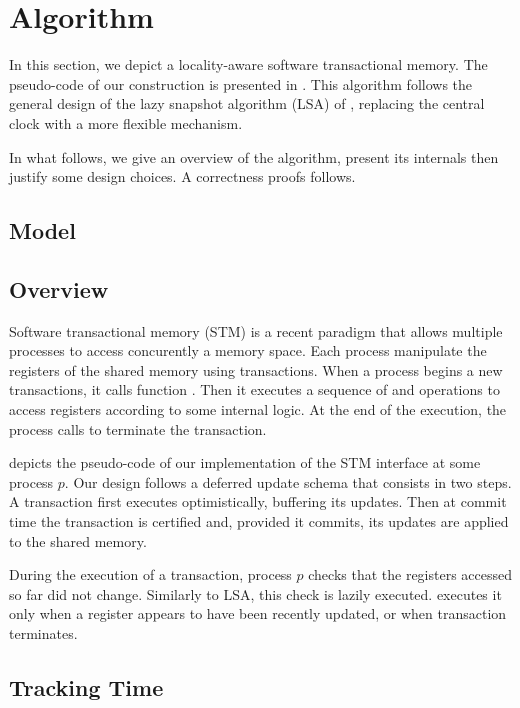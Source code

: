 \section{Algorithm}

In this section, we depict a locality-aware software transactional memory.
The pseudo-code of our construction is presented in .
This algorithm follows the general design of the lazy snapshot algorithm (LSA) of \citet{FelberFMR10}, replacing the central clock with a more flexible mechanism.

In what follows, we give an overview of the algorithm, present its internals then justify some design choices.
A correctness proofs follows.

\subsection{Model}


\subsection{Overview}

Software transactional memory (STM) is a recent paradigm that allows multiple processes to access concurently a memory space.
Each process manipulate the registers of the shared memory using transactions.
When a process begins a new transactions, it calls function \stmStartFunction.
Then it executes a sequence of \stmReadFunction and \stmWriteFunction operations to access registers according to some internal logic.
At the end of the execution, the process calls \stmTryCommitFunction to terminate the transaction.

 depicts the pseudo-code of our implementation of the STM interface at some process $p$.
Our design follows a deferred update schema that consists in two steps.
A transaction first executes optimistically, buffering its updates.
Then at commit time the transaction is certified and, provided it commits, its updates are applied to the shared memory.

During the execution of a transaction, process $p$ checks that the registers accessed so far did not change.
Similarly to LSA, this check is lazily executed.
 executes it only when a register appears to have been recently updated, or when transaction terminates.

\subsection{Tracking Time}

